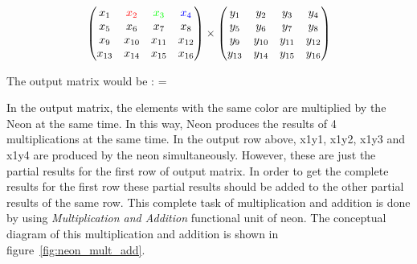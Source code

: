 $$
\begin{pmatrix}
 x_{1} 	& \color{red}{x_{2}} 	& \color{green}{x_{3}}	& \color{blue}{x_{4}}\\
 x_{5} 	& x_{6} 				& x_{7}					& x_{8}\\
 x_{9} 	& x_{10} 				& x_{11}				& x_{12}\\
 x_{13} & x_{14} 				& x_{15}				& x_{16}\\
\end{pmatrix}
\times
\begin{pmatrix}
y_{1} 	& y_{2} 	& y_{3} 	& y_{4} 	\\
y_{5} 	& y_{6} 	& y_{7} 	& y_{8} 	\\
y_{9} 	& y_{10} 	& y_{11} 	& y_{12} 	\\
y_{13}	& y_{14} 	& y_{15} 	& y_{16} 	\\
\end{pmatrix}
$$


The output matrix would be :
=
\begin{table}[h]
\end{table}

In the output matrix, the elements with the same color are multiplied by the Neon at the same time. In this way, Neon produces the results of 4 multiplications at the same time. In the output row above, x1y1, x1y2, x1y3 and x1y4 are produced by the neon simultaneously. However, these are just the partial results for the first row of output matrix. In order to get the complete results for the first row these partial results should be added to the other partial results of the same row. This complete task of multiplication and addition is done by using \emph{Multiplication and Addition} functional unit of neon. The conceptual diagram of this multiplication and addition is shown in figure~\ref{fig:neon_mult_add}.

